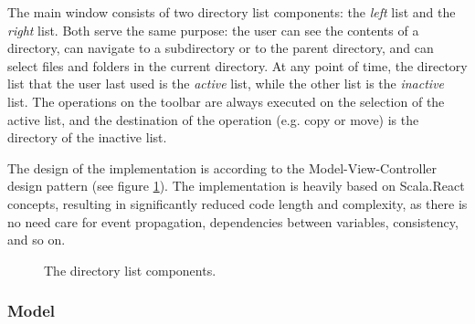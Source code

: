 The main window consists of two directory list components: the \emph{left} list and the \emph{right} list. Both serve the same purpose: the user can see the contents of a directory, can navigate to a subdirectory or to the parent directory, and can select files and folders in the current directory. At any point of time, the directory list that the user last used is the \emph{active} list, while the other list is the \emph{inactive} list. The operations on the toolbar are always executed on the selection of the active list, and the destination of the operation (e.g. copy or move) is the directory of the inactive list.

The design of the implementation is according to the Model-View-Controller design pattern (see figure \ref{fig:mvc_pattern}). The implementation is heavily based on Scala.React concepts, resulting in significantly reduced code length and complexity, as there is no need care for event propagation, dependencies between variables, consistency, and so on.


\begin{figure}[h!]
\centering
{}
\caption{The directory list components.}
\label{fig:mvc_pattern}
\end{figure}


\subsubsection{Model}

